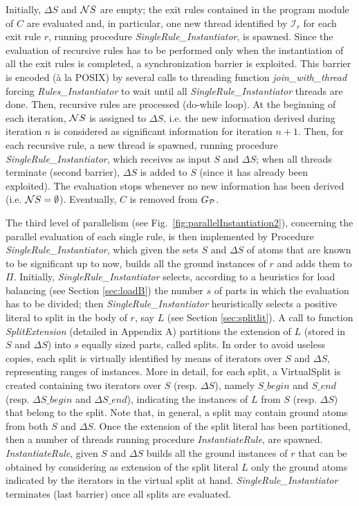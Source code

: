 \documentclass[preprint]{tlp}
\newcommand{\DNF}{\ensuremath{\Delta S}\xspace}
\newcommand{\NNF}{\ensuremath{{\cal N}S}\xspace}
\newcommand{\p}{\ensuremath{{\cal P}}\xspace}
\newcommand{\dgp}{\mbox{$G_{\p}$}}
\begin{document}
 Initially, \DNF and \NNF are empty; the exit rules contained in the program module
of $C$ are evaluated  and, in particular, one new thread identified by $\mathcal{I}_r$ for each
exit rule $r$, running procedure {\em SingleRule\_Instantiator}, is
spawned. Since the evaluation of recursive rules has to be performed only
when the instantiation of all the exit rules is completed, a synchronization barrier is
exploited. This barrier is encoded (\`{a} la POSIX) by several calls to threading function {\em join\_with\_thread}
forcing {\em Rules\_Instantiator} to wait until all {\em SingleRule\_Instantiator} threads are done.
Then, recursive rules are
processed (do-while loop). At the beginning of each iteration, \NNF
is assigned to \DNF, i.e. the new information derived during
iteration $n$ is considered as significant information for iteration
$n+1$. Then, for each recursive rule, a new thread is spawned,
running procedure {\em SingleRule\_Instantiator}, which receives as
input $S$ and $\DNF$; when all threads terminate (second barrier), \DNF is added to
$S$ (since it has already been exploited). The evaluation stops
whenever no new information has been derived (i.e. $\NNF =
\emptyset$). Eventually, $C$ is removed from $\dgp$.

The third level of parallelism (see Fig.~\ref{fig:parallelInstantiation2}), concerning the parallel evaluation
of each single rule, is then implemented by Procedure {\em SingleRule\_Instantiator},
which given the sets $S$ and $\DNF$ of  atoms that are known to be significant up to now, builds all the
ground instances of $r$ and adds them to $\Pi$.
Initially, {\em SingleRule\_Instantiator} selects, according to a
heuristics for load balancing (see Section \ref{sec:loadB}) the
number $s$ of parts in which the evaluation has to be divided; then
{\em SingleRule\_Instantiator} heuristically selects a positive
literal to split in the body of $r$, say $L$ (see Section
\ref{sec:splitlit}). A call to function {\em SplitExtension}
(detailed in Appendix A) partitions the extension of $L$ (stored in
$S$ and $\DNF$) into $s$  equally sized parts, called splits. In
order to avoid useless copies, each split is virtually identified by
means of iterators over $S$ and $\DNF$, representing ranges of
instances. More in detail, for each  split, a VirtualSplit is
created containing two iterators over $S$ (resp. \DNF), namely
$S\_begin$ and $S\_end$ (resp. $\DNF\_begin$ and $\DNF\_end$),
indicating the instances of $L$ from $S$ (resp. \DNF) that belong to
the split. Note that, in general, a split may contain ground atoms
from both $S$ and \DNF. Once the extension of the split literal has
been partitioned, then a number of threads running procedure {\em
InstantiateRule}, are spawned. {\em InstantiateRule}, given $S$ and
\DNF builds all the ground instances of $r$ that can be obtained by
considering as extension of the split literal $L$ only the ground
atoms indicated by the iterators in the virtual split at hand. {\em
SingleRule\_Instantiator} terminates (last barrier) once all splits
are evaluated.
\end{document}
